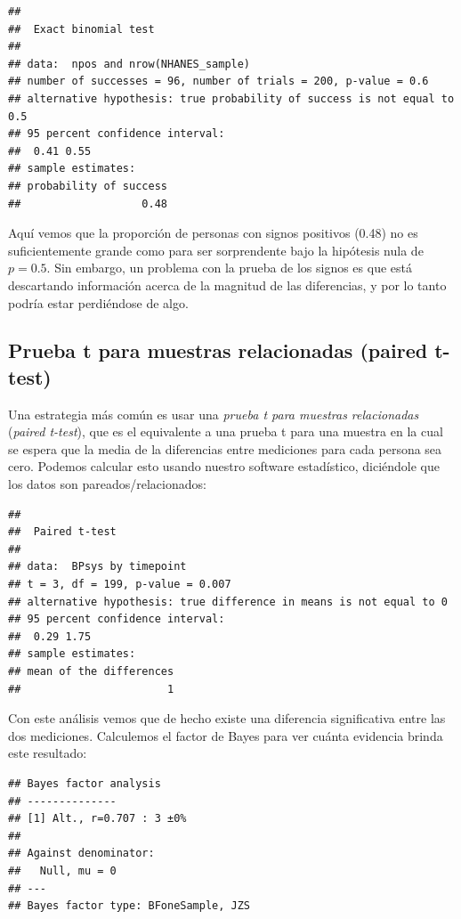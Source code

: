\documentclass[
  12pt,
]{book}
\theoremstyle{definition}
\theoremstyle{definition}
\theoremstyle{definition}
\theoremstyle{remark}
\begin{document}
\begin{verbatim}
## 
## 	Exact binomial test
## 
## data:  npos and nrow(NHANES_sample)
## number of successes = 96, number of trials = 200, p-value = 0.6
## alternative hypothesis: true probability of success is not equal to 0.5
## 95 percent confidence interval:
##  0.41 0.55
## sample estimates:
## probability of success 
##                   0.48
\end{verbatim}

Aquí vemos que la proporción de personas con signos positivos (0.48) no es suficientemente grande como para ser sorprendente bajo la hipótesis nula de \(p=0.5\). Sin embargo, un problema con la prueba de los signos es que está descartando información acerca de la magnitud de las diferencias, y por lo tanto podría estar perdiéndose de algo.

\hypertarget{prueba-t-para-muestras-relacionadas-paired-t-test}{%
\subsection{Prueba t para muestras relacionadas (paired t-test)}\label{prueba-t-para-muestras-relacionadas-paired-t-test}}

Una estrategia más común es usar una \emph{prueba t para muestras relacionadas} (\emph{paired t-test}), que es el equivalente a una prueba t para una muestra en la cual se espera que la media de la diferencias entre mediciones para cada persona sea cero. Podemos calcular esto usando nuestro software estadístico, diciéndole que los datos son pareados/relacionados:

\begin{verbatim}
## 
## 	Paired t-test
## 
## data:  BPsys by timepoint
## t = 3, df = 199, p-value = 0.007
## alternative hypothesis: true difference in means is not equal to 0
## 95 percent confidence interval:
##  0.29 1.75
## sample estimates:
## mean of the differences 
##                       1
\end{verbatim}

Con este análisis vemos que de hecho existe una diferencia significativa entre las dos mediciones. Calculemos el factor de Bayes para ver cuánta evidencia brinda este resultado:

\begin{verbatim}
## Bayes factor analysis
## --------------
## [1] Alt., r=0.707 : 3 ±0%
## 
## Against denominator:
##   Null, mu = 0 
## ---
## Bayes factor type: BFoneSample, JZS
\end{verbatim}
\end{document}
